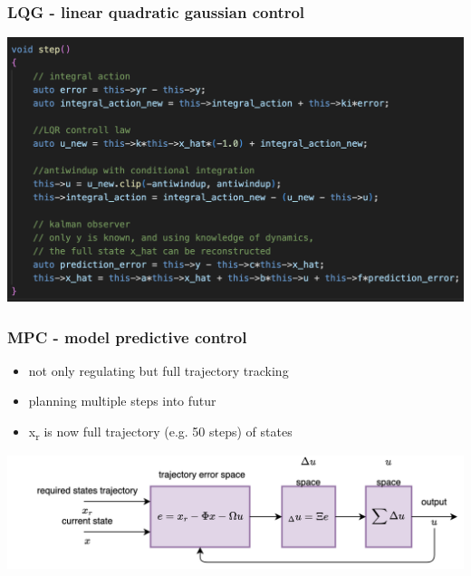 \documentclass{beamer}
\begin{document}
\begin{frame}
  \frametitle{\bf LQG - linear quadratic gaussian control}
  {\centering \includegraphics[scale=0.4]{../diagrams/controll/lqg_cpp.png}}

\end{frame}



\begin{frame}
  \frametitle{\bf MPC - model predictive control}

  \begin{itemize}
    \item not only regulating but full trajectory tracking
    \item planning multiple steps into futur
    \item x\textsubscript{r} is now full trajectory (e.g. 50 steps) of states
  \end{itemize}

  {\centering \includegraphics[scale=0.6]{../diagrams/controll/control-mpc.png}}

\end{frame}
\end{document}
